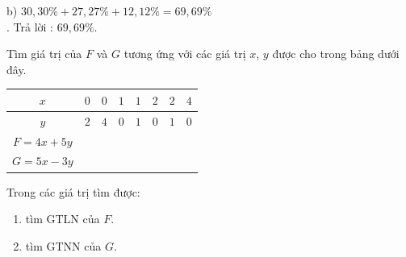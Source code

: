 \begin{bt}
{\begin{enumerate}
b) $30{,}30\%+27{,}27\%+12{,}12\%= 69{,}69\%$\\  .
Trả lời : $69{,}69\%$.
\end{enumerate}
}
\end{bt}

\begin{bt}%
	Tìm giá trị của $F$ và $G$ tương ứng với các giá trị $x$, $y$ được cho trong bảng dưới đây.
	\begin{center}
		\begin{tabular}{|c|c|c|c|c|c|c|c|}
			\hline 
			$x$ & $0$ & $0$ & $1$ & $1$ & $2$ & $2$ & $4$ \\ 
			\hline 
			$y$ & $2$ & $4$ & $0$ & $1$ & $0$ & $1$ & $0$ \\
			\hline
			$F=4x+5y$ & & & & & & & \\
			\hline
			$G=5x-3y$ & & & & & & & \\
			\hline 
		\end{tabular}
	\end{center}
	Trong các giá trị tìm được:
	\begin{enumerate}
		\item tìm GTLN của $F$.
		\item tìm GTNN của $G$.
	\end{enumerate}
\end{bt}

